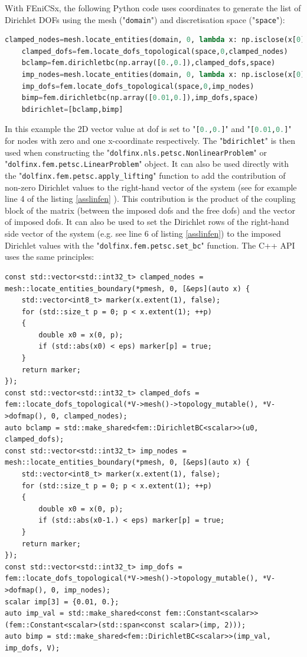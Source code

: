 \documentclass[12pt]{article}
\newcommand{\f}[1]{FEniCSx#1}
\newcommand{\mycode}[1]{\textsf{"}\lstinline`#1`\textsf{"}}
\newcommand{\mycodepy}[1]{\textsf{"}\lstinline[language=Python]`#1`\textsf{"}}
\begin{document}
\bigskip
With \f{}, the following Python code uses coordinates to generate the list of Dirichlet DOFs using the mesh (\mycodepy{domain}) and discretisation space (\mycode{space}):
\begin{lstlisting}[numbers=none,basicstyle=\footnotesize,language=Python,label=pyfendiri]
	clamped_nodes=mesh.locate_entities(domain, 0, lambda x: np.isclose(x[0], 0.))
	clamped_dofs=fem.locate_dofs_topological(space,0,clamped_nodes)
	bclamp=fem.dirichletbc(np.array([0.,0.]),clamped_dofs,space)
	imp_nodes=mesh.locate_entities(domain, 0, lambda x: np.isclose(x[0], 1.))
	imp_dofs=fem.locate_dofs_topological(space,0,imp_nodes)
	bimp=fem.dirichletbc(np.array([0.01,0.]),imp_dofs,space)
	bdirichlet=[bclamp,bimp]
\end{lstlisting}
In this example the 2D vector value at dof is set to \mycodepy{[0.,0.]} and \mycodepy{[0.01,0.]} for nodes with zero and one x-coordinate respectively. The \mycodepy{bdirichlet} is then used when constructing the \mycodepy{dolfinx.nls.petsc.NonlinearProblem} or \mycodepy{dolfinx.fem.petsc.LinearProblem} object. 
It can also be used directly with the \mycodepy{dolfinx.fem.petsc.apply_lifting} function to add the contribution of non-zero Dirichlet values to the right-hand vector of the system (see for example line 4 of the listing \ref{asslinfen} ). This contribution is the product of the coupling block of the matrix (between the imposed dofs and the free dofs) and the vector of imposed dofs.
It can also be used to set the Dirichlet rows of the right-hand side vector of the system (e.g. see line 6 of listing \ref{asslinfen}) to the imposed Dirichlet values with the \mycodepy{dolfinx.fem.petsc.set_bc} function.
The C++ API uses the same principles:
\begin{lstlisting}[numbers=none,basicstyle=\footnotesize,label=dirichletfenicsxcpp]
const std::vector<std::int32_t> clamped_nodes = mesh::locate_entities_boundary(*pmesh, 0, [&eps](auto x) {
	std::vector<int8_t> marker(x.extent(1), false);
	for (std::size_t p = 0; p < x.extent(1); ++p)
	{
		double x0 = x(0, p);
		if (std::abs(x0) < eps) marker[p] = true;
	}
	return marker;
});
const std::vector<std::int32_t> clamped_dofs = fem::locate_dofs_topological(*V->mesh()->topology_mutable(), *V->dofmap(), 0, clamped_nodes);
auto bclamp = std::make_shared<fem::DirichletBC<scalar>>(u0, clamped_dofs);
const std::vector<std::int32_t> imp_nodes = mesh::locate_entities_boundary(*pmesh, 0, [&eps](auto x) {
	std::vector<int8_t> marker(x.extent(1), false);
	for (std::size_t p = 0; p < x.extent(1); ++p)
	{
		double x0 = x(0, p);
		if (std::abs(x0-1.) < eps) marker[p] = true;
	}
	return marker;
});
const std::vector<std::int32_t> imp_dofs = fem::locate_dofs_topological(*V->mesh()->topology_mutable(), *V->dofmap(), 0, imp_nodes);
scalar imp[3] = {0.01, 0.};
auto imp_val = std::make_shared<const fem::Constant<scalar>>(fem::Constant<scalar>(std::span<const scalar>(imp, 2)));
auto bimp = std::make_shared<fem::DirichletBC<scalar>>(imp_val, imp_dofs, V);
\end{lstlisting}
\end{document}
